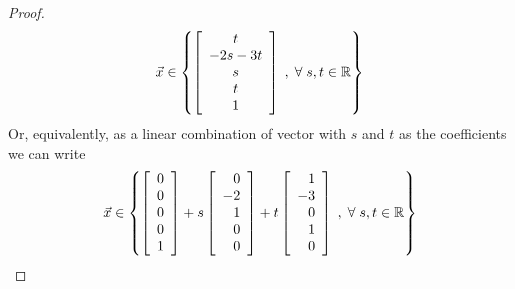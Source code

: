 \documentclass{tutorial}
\begin{document}
\begin{proof}
\[
    \vec{x} \in \left\{ \left[ \begin{array}{c} t \\ -2s - 3t \\ s \\ t \\ 1 \end{array} \right] \; , \; \forall \; s,t \in \mathbb{R} \right\}
\]
Or, equivalently, as a linear combination of vector with $s$ and $t$ as the coefficients we can write
\[
    \vec{x} \in \left\{ 
            \left[ \begin{array}{r} 0 \\ 0 \\ 0 \\ 0 \\ 1 \end{array} \right]  
        + s \left[ \begin{array}{r} 0 \\ -2 \\ 1 \\ 0 \\ 0 \end{array} \right]
        + t \left[ \begin{array}{r} 1 \\ -3 \\ 0 \\ 1 \\ 0 \end{array} \right]
    \; , \; \forall \; s,t \in \mathbb{R} \right\}
\]

\end{proof}\else \newpage \fi
\end{document}
